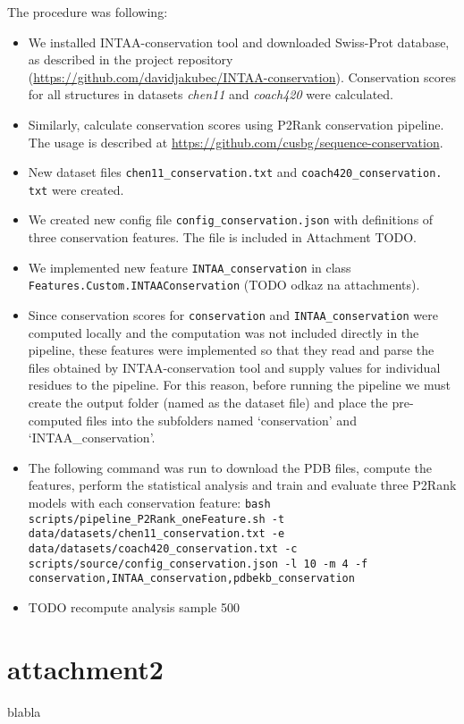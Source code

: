 \documentclass[12pt,a4paper]{report}
\let\openright=\clearpage
\begin{document}
The procedure was following:
\begin{itemize}
\item We installed INTAA-conservation tool and downloaded Swiss-Prot database, as described in the project repository (\url{https://github.com/davidjakubec/INTAA-conservation}). Conservation scores for all structures in datasets \textit{chen11} and \textit{coach420} were calculated.
\item Similarly, calculate conservation scores using P2Rank conservation pipeline. The usage is described at \url{https://github.com/cusbg/sequence-conservation}.
\item New dataset files \texttt{chen11\_conservation.txt} and \texttt{coach420\_conservation. txt} were created.
\item We created new config file \texttt{config\_conservation.json} with definitions of three conservation features. The file is included in Attachment TODO. 
\item We implemented new feature \texttt{INTAA\_conservation} in class \texttt{Features.Custom.INTAAConservation} (TODO odkaz na attachments).
\item Since conservation scores for \texttt{conservation} and \texttt{INTAA\_conservation} were computed locally and the computation was not included directly in the pipeline, these features were implemented so that they read and parse the files obtained by INTAA-conservation tool and supply values for individual residues to the pipeline. For this reason, before running the pipeline we must create the output folder (named as the dataset file) and place the pre-computed files into the subfolders named `conservation' and `INTAA\_conservation'.
\item The following command was run to download the PDB files, compute the features, perform the statistical analysis and train and evaluate three P2Rank models with each conservation feature: \texttt{bash scripts/pipeline\_P2Rank\_oneFeature.sh -t data/datasets/chen11\_conservation.txt -e data/datasets/coach420\_conservation.txt -c scripts/source/config\_conservation.json -l 10 -m 4 -f conservation,INTAA\_conservation,pdbekb\_conservation}
\item TODO recompute analysis sample 500
\end{itemize}

\section{attachment2}

blabla

\openright
\end{document}
